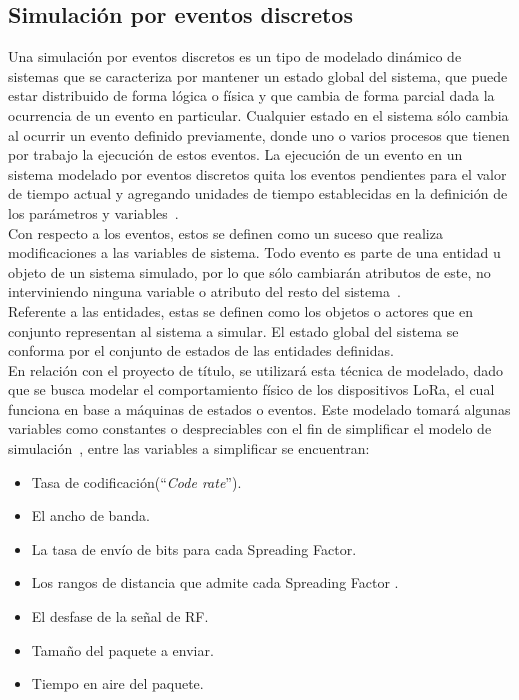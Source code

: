 \begin{justify}
\subsection{Simulación por eventos discretos}
Una simulación por eventos discretos es un tipo de modelado dinámico de sistemas que se caracteriza por mantener un estado global del sistema, que puede estar distribuido de forma lógica o física y que cambia de forma parcial dada la ocurrencia de un evento en particular. Cualquier estado en el sistema sólo cambia al ocurrir un evento definido previamente, donde uno o varios procesos que tienen por trabajo la ejecución de estos eventos. La ejecución de un evento en un sistema modelado por eventos discretos quita los eventos pendientes para el valor de tiempo actual y agregando unidades de tiempo establecidas en la definición de los parámetros y variables~\cite{simubook}.\\
Con respecto a los eventos, estos se definen como un suceso que realiza modificaciones a las variables de sistema. Todo evento es parte de una entidad u objeto de un sistema simulado, por lo que sólo cambiarán atributos de este, no interviniendo ninguna variable o atributo del resto del sistema~\cite{simubook}.\\
Referente a las entidades, estas se definen como los objetos o actores que en conjunto representan al sistema a simular. El estado global del sistema se conforma por el conjunto de estados de las entidades definidas.\\
En relación con el proyecto de título, se utilizará esta técnica de modelado, dado que se busca modelar el comportamiento físico de los dispositivos LoRa, el cual funciona en base a máquinas de estados o eventos. Este modelado tomará algunas variables como constantes o despreciables con el fin de simplificar el modelo de simulación~\cite{orange}, entre las variables a simplificar se encuentran:\\
\begin{itemize}
\item Tasa de codificación(``\textit{Code rate}'').
\item El ancho de banda.
\item La tasa de envío de bits para cada Spreading Factor.
\item Los rangos de distancia que admite cada Spreading Factor .
\item El desfase de la señal de RF.
\item Tamaño del paquete a enviar.
\item Tiempo en aire del paquete.

\end{itemize}
\end{justify}
